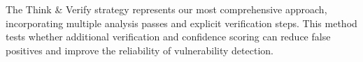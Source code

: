 \documentclass[sigconf]{acmart}
\begin{document}
The Think \& Verify strategy represents our most comprehensive approach, incorporating multiple analysis passes and explicit verification steps. This method tests whether additional verification and confidence scoring can reduce false positives and improve the reliability of vulnerability detection.
\end{document}
